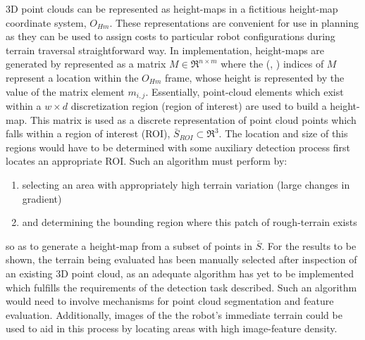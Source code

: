 			3D point clouds can be represented as height-maps in a fictitious height-map coordinate system, $O_{Hm}$. These representations are convenient for use in planning as they can be used to assign costs to particular robot configurations during terrain traversal straightforward way. In implementation, height-maps are generated by represented as a matrix  $M\in \Re^{n\times m}$ where the (\Ith, \Jth) indices of $M$ represent a location within the $O_{Hm}$ frame, whose height is represented by the value of the matrix element $m_{i,j}$. Essentially, point-cloud elements which exist within a $w\times d$  discretization region (region of interest) are used to build a height-map. This matrix is used as a discrete representation of point cloud points which falls within a region of interest (ROI), $\bar{S}_{ROI}\subset\Re^{3}$. The location and size of this regions would have to be determined with some auxiliary detection process first locates an appropriate ROI. Such an algorithm must perform by:
			\begin{enumerate}
				\item selecting an area with appropriately high terrain variation (large changes in gradient)
				\item and determining the bounding region where this patch of rough-terrain exists
			\end{enumerate}
			so as to generate a height-map from a subset of points in $\bar{S}$. For the results to be shown, the terrain being evaluated has been manually selected after inspection of an existing 3D point cloud, as an adequate algorithm has yet to be implemented which fulfills the requirements of the detection task described. Such an algorithm would need to involve mechanisms for point cloud segmentation and feature evaluation. Additionally, images of the the robot's immediate terrain could be used to aid in this process by locating areas with high image-feature density.


